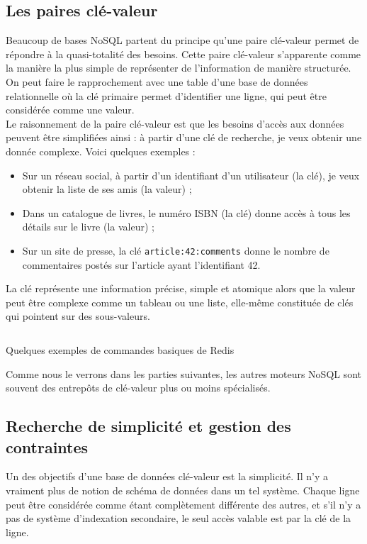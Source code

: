 \subsection{Les paires clé-valeur}
	Beaucoup de bases NoSQL partent du principe qu'une paire clé-valeur permet de répondre à la quasi-totalité des besoins. Cette paire clé-valeur s'apparente comme la manière la plus simple de représenter de l'information de manière structurée. On peut faire le rapprochement avec une table d'une base de données relationnelle où la clé primaire permet d'identifier une ligne, qui peut être considérée comme une valeur.\\

	Le raisonnement de la paire clé-valeur est que les besoins d'accès aux données peuvent être simplifiées ainsi : à partir d'une clé de recherche, je veux obtenir une donnée complexe. Voici quelques exemples :
	\begin{itemize}
		\item Sur un réseau social, à partir d'un identifiant d'un utilisateur (la clé), je veux obtenir la liste de ses amis (la valeur) ;
		\item Dans un catalogue de livres, le numéro ISBN (la clé) donne accès à tous les détails sur le livre (la valeur) ;
		\item Sur un site de presse, la clé \texttt{article:42:comments} donne le nombre de commentaires postés sur l'article ayant l'identifiant 42.
	\end{itemize}
	\vspace{20px}

	La clé représente une information précise, simple et atomique alors que la valeur peut être complexe comme un tableau ou une liste, elle-même constituée de clés qui pointent sur des sous-valeurs.\\

	\begin{listing}[H]
		\inputminted{text}{code/commandesRedis.txt}
		\caption{Quelques exemples de commandes basiques de Redis}
	\end{listing}

	Comme nous le verrons dans les parties suivantes, les autres moteurs NoSQL sont souvent des entrepôts de clé-valeur plus ou moins spécialisés.

\subsection{Recherche de simplicité et gestion des contraintes}
	Un des objectifs d'une base de données clé-valeur est la simplicité. Il n'y a vraiment plus de notion de schéma de données dans un tel système. Chaque ligne peut être considérée comme étant complètement différente des autres, et s'il n'y a pas de système d'indexation secondaire, le seul accès valable est par la clé de la ligne.\\

